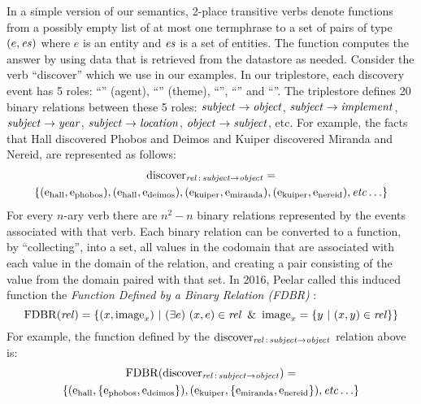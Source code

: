\documentclass[../main.tex]{subfiles}
\begin{document}
\begin{refsection}
In a simple version of our semantics, 2-place transitive verbs denote functions from a possibly empty list of
at most one termphrase to a set of pairs of type $(e,\operatorname{\mathit{es}})$ where $e$ is an entity and $\operatorname{\mathit{es}}$
is a set of entities. The function computes the answer by using data that is retrieved from the datastore
as needed. Consider the verb ``discover'' which we use in our examples. In our triplestore, each
discovery event has 5 roles: ``'' (agent), ``'' (theme), ``'', ``''
and ``''. The triplestore defines 20 binary relations between these 5 roles: $\operatorname{\mathit{subject}} \rightarrow \operatorname{\mathit{object}}$,
$\operatorname{\mathit{subject}} \rightarrow \operatorname{\mathit{implement}}$, $\operatorname{\mathit{subject}} \rightarrow \operatorname{\mathit{year}}$, $\operatorname{\mathit{subject}} \rightarrow \operatorname{\mathit{location}}$, $\operatorname{\mathit{object}} \rightarrow \operatorname{\mathit{subject}}$, etc. For example,
the facts that Hall discovered Phobos and Deimos and Kuiper discovered Miranda and Nereid,
are represented as follows:
\begin{multline*}
	\operatorname{discover}_{\operatorname{\mathit{rel}}\,:\,\operatorname{\mathit{subject}} \rightarrow \operatorname{\mathit{object}}} = \\ \{ (\mathrm{e}_{\operatorname{hall}}, \mathrm{e}_{\operatorname{phobos}}), (\mathrm{e}_{\operatorname{hall}}, \mathrm{e}_{\operatorname{deimos}}), (\mathrm{e}_{\operatorname{kuiper}}, \mathrm{e}_{\operatorname{miranda}}), (\mathrm{e}_{\operatorname{kuiper}}, \mathrm{e}_{\operatorname{nereid}}), \operatorname{\mathit{etc\ldots}} \}
\end{multline*}
For every $n$-ary verb there are $n^2 - n$ binary relations represented by the events associated
with that verb.
Each binary relation can be converted to a function, by ``collecting'', into a set, all values
in the codomain that are associated with each value in the domain of the relation, and creating
a pair consisting of the value from the domain paired with that set. In 2016, Peelar called this induced function the {\em Function Defined by a Binary Relation (FDBR)} \cite{peelar2016accommodating}:
\begin{equation*}
	\FDBR{\rel} = \{(x, \image_x)\ |\ (\exists e)\ (x, e) \in \rel\ \&\ \image_x = \{ y\ |\ (x, y) \in \rel \}  \}
\end{equation*}
For example, the function defined by the $\operatorname{discover}_{\operatorname{\mathit{rel}}\,:\,\operatorname{\mathit{subject}} \rightarrow \operatorname{\mathit{object}}}$ relation above is:
\begin{multline*}
	\operatorname{FDBR}({\operatorname{discover}_{\operatorname{\mathit{rel}}\,:\,\operatorname{\mathit{subject}} \rightarrow \operatorname{\mathit{object}}}}) = \\ \{ (\mathrm{e}_{\operatorname{hall}}, \{\mathrm{e}_{\operatorname{phobos}}, \mathrm{e}_{\operatorname{deimos}}\}), (\mathrm{e}_{\operatorname{kuiper}}, \{ \mathrm{e}_{\operatorname{miranda}}, \mathrm{e}_{\operatorname{nereid}} \}),
	\operatorname{\mathit{etc\ldots}} \}
\end{multline*}

\end{refsection}
\end{document}
